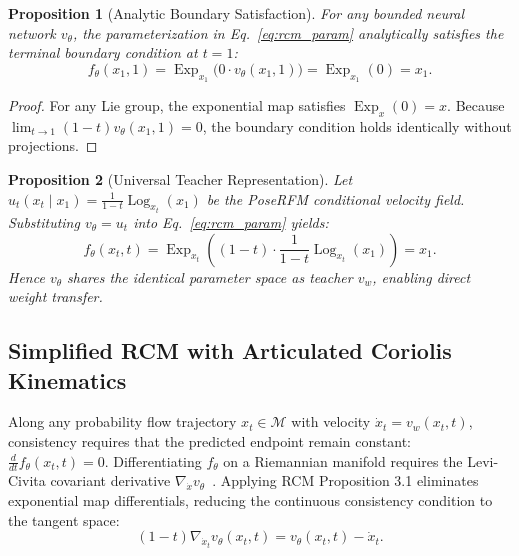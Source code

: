 \documentclass[10pt,twocolumn,letterpaper]{article}
\DeclareMathOperator{\Exp}{Exp}
\DeclareMathOperator{\Log}{Log}
\newtheorem{proposition}{Proposition}
\begin{document}
\begin{proposition}[Analytic Boundary Satisfaction]
For any bounded neural network $v_\theta$, the parameterization in Eq.~\eqref{eq:rcm_param} analytically satisfies the terminal boundary condition at $t = 1$:
\begin{equation}
f_\theta(x_1, 1) = \Exp_{x_1}\big( 0 \cdot v_\theta(x_1, 1) \big) = \Exp_{x_1}(0) = x_1.
\end{equation}
\end{proposition}
\begin{proof}
For any Lie group, the exponential map satisfies $\Exp_x(0) = x$. Because $\lim_{t \to 1} (1 - t) v_\theta(x_1, 1) = 0$, the boundary condition holds identically without projections.
\end{proof}

\begin{proposition}[Universal Teacher Representation]
Let $u_t(x_t \mid x_1) = \frac{1}{1-t}\Log_{x_t}(x_1)$ be the PoseRFM conditional velocity field. Substituting $v_\theta = u_t$ into Eq.~\eqref{eq:rcm_param} yields:
\begin{equation}
f_\theta(x_t, t) = \Exp_{x_t}\left( (1-t) \cdot \frac{1}{1-t}\Log_{x_t}(x_1) \right) = x_1.
\end{equation}
Hence $v_\theta$ shares the identical parameter space as teacher $v_w$, enabling direct weight transfer.
\end{proposition}

\subsection{Simplified RCM with Articulated Coriolis Kinematics}
Along any probability flow trajectory $x_t \in \mathcal{M}$ with velocity $\dot{x}_t = v_w(x_t, t)$, consistency requires that the predicted endpoint remain constant: $\frac{d}{dt} f_\theta(x_t, t) = 0$.
Differentiating $f_\theta$ on a Riemannian manifold requires the Levi-Civita covariant derivative $\nabla_{\dot{x}} v_\theta$~\cite{zhou2025rcm}. Applying RCM Proposition 3.1 eliminates exponential map differentials, reducing the continuous consistency condition to the tangent space:
\begin{equation}
(1 - t) \nabla_{\dot{x}_t} v_\theta(x_t, t) = v_\theta(x_t, t) - \dot{x}_t.
\label{eq:consistency_condition}
\end{equation}
\end{document}
